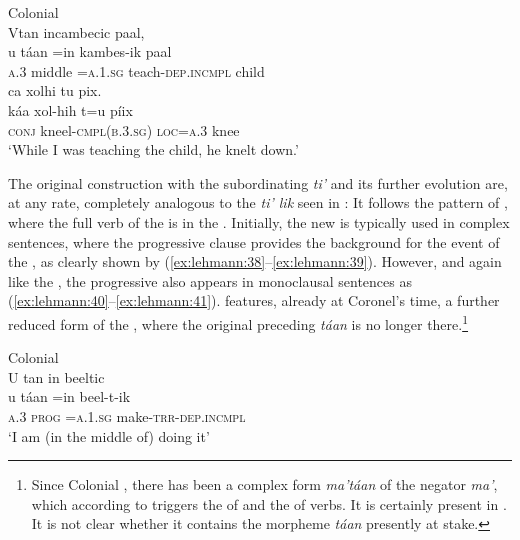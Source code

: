 \documentclass[output=paper]{langsci/langscibook}
\begin{document}
\ea\label{ex:lehmann:39}
Colonial  \\
      Vtan            incambecic      paal,\\
\gll   u    táan  =in      kambes-ik      paal\\
\textsc{a.3}  middle  =\textsc{a.1.sg}    teach-\textsc{dep.incmpl}  child\\

  ca      xolhi            tu         pix.\\
\gll   káa    xol-hih          t=u       píix\\
\textsc{conj}    kneel-\textsc{cmpl(b.3.sg) }  \textsc{loc=a.3}   knee\\
\glt ‘While I was teaching the child, he knelt down.’ \citep[9Br]{SanBuenaventura1684}
\z



The original construction with the subordinating \textit{ti’} and its further evolution are, at any rate, completely analogous to the  \textit{ti’ lik} seen in : It follows the pattern of , where the full verb of the  is in the  . Initially, the new  is typically used in complex sentences, where the progressive clause provides the background for the event of the , as clearly shown by (\ref{ex:lehmann:38}–\ref{ex:lehmann:39}). However, and again like the , the progressive also appears in monoclausal sentences as (\ref{ex:lehmann:40}–\ref{ex:lehmann:41}).  features, already at Coronel’s time, a further reduced form of the , where the original   preceding \textit{táan} is no longer there.\footnote{Since Colonial  , there has been a complex form \textit{ma’táan} of the negator \textit{ma’}, which according to \citet[83]{Coronel1620} triggers the  of  and the  of  verbs. It is certainly present in . It is not clear whether it contains the morpheme \textit{táan} presently at stake.}


\ea\label{ex:lehmann:40}
Colonial   \\
      U    tan    in        beeltic\\
\gll   u    táan    =in      beel-t-ik\\
\textsc{a.3}   \textsc{prog }    \textsc{=a.1.sg}    make-\textsc{trr-dep.incmpl}\\
\glt ‘I am (in the middle of) doing it’ \citep[37r]{SanBuenaventura1684}
\z
\end{document}
